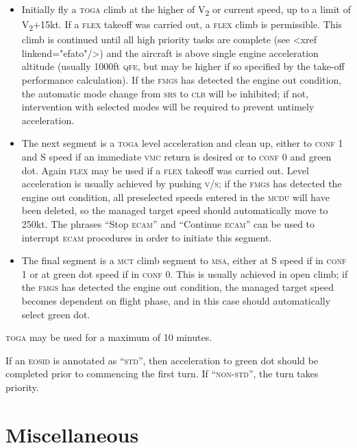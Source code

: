 \documentclass[a5paper,11pt,twoside]{book}
\newcommand{\inlcite}[1]{{\footnotesize\scshape\MakeLowercase{[#1]}}}
\newcommand{\multicite}[1]{%

  \nopagebreak
  \noindent{{\color{blue}\inlcite{#1}}}
}
\newcommand{\V}[1]{V\textsubscript{#1}}
\newcommand{\ac}[1]{{\scshape\MakeLowercase{#1}}}
\begin{document}
\begin{itemize}
\item Initially fly a \ac{TOGA} climb at the higher of \V{2} or current speed,
  up to a limit of \V{2}+15kt. If a \ac{FLEX} takeoff was carried out, a
  \ac{FLEX} climb is permissible. This climb is continued until all high
  priority tasks are complete (see <xref linkend="efato"/>) and the aircraft is
  above single engine acceleration altitude (usually 1000ft \ac{QFE}, but may be
  higher if so specified by the take-off performance calculation). If the
  \ac{FMGS} has detected the engine out condition, the automatic mode change
  from \ac{SRS} to \ac{CLB} will be inhibited; if not, intervention with
  selected modes will be required to prevent untimely acceleration.

\item The next segment is a \ac{TOGA} level acceleration and clean up, either to
  \ac{Conf} 1 and S speed if an immediate \ac{VMC} return is desired or to
  \ac{Conf} 0 and green dot. Again \ac{FLEX} may be used if a \ac{FLEX} takeoff
  was carried out. Level acceleration is usually achieved by pushing \ac{V/S};
  if the \ac{FMGS} has detected the engine out condition, all preselected speeds
  entered in the \ac{MCDU} will have been deleted, so the managed target speed
  should automatically move to 250kt. The phrases ``Stop \ac{ECAM}'' and
  ``Continue \ac{ECAM}'' can be used to interrupt \ac{ECAM} procedures in order
  to initiate this segment.

\item The final segment is a \ac{MCT} climb segment to \ac{MSA}, either at S
  speed if in \ac{Conf} 1 or at green dot speed if in \ac{Conf} 0. This is
  usually achieved in open climb; if the \ac{FMGS} has detected the engine out
  condition, the managed target speed becomes dependent on flight phase, and in
  this case should automatically select green dot.
\end{itemize}

\ac{TOGA} may be used for a maximum of 10 minutes.

If an \ac{EOSID} is annotated as ``\ac{STD}'', then acceleration to green dot should
be completed prior to commencing the first turn. If ``\ac{NON-STD}'', the turn takes
priority.

\multicite{EOMB~4.4.4, FCOM~DSC.22\_20.60.40}

\chapter{Miscellaneous}
\end{document}
